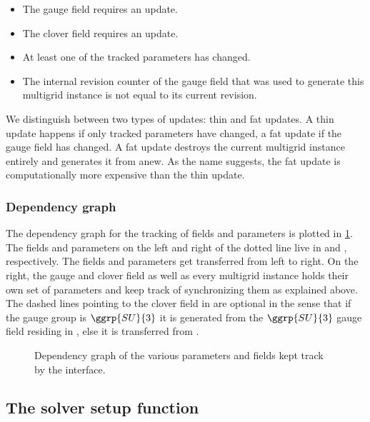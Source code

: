 \begin{itemize}
  \item The gauge field requires an update.
  \item The clover field requires an update.
  \item At least one of the tracked parameters has changed.
  \item The internal revision counter of the gauge field that was used to generate this multigrid instance is not equal to its current revision.
\end{itemize}
We distinguish between two types of updates: thin and fat updates.
A thin update happens if only tracked parameters have changed, a fat update if the gauge field has changed.
A fat update destroys the current multigrid instance entirely and generates it from anew.
As the name suggests, the fat update is computationally more expensive than the thin update.

\subsubsection{Dependency graph}

The dependency graph for the tracking of fields and parameters is plotted in \cref{fig:dep}.
The fields and parameters on the left and right of the dotted line live in \openqxd and \quda, respectively.
The fields and parameters get transferred from left to right.
On the right, the gauge and clover field as well as every multigrid instance holds their own set of parameters and keep track of synchronizing them as explained above.
The dashed lines pointing to the clover field in \quda are optional in the sense that if the gauge group is $\ggrp{SU}{3}$ it is generated from the $\ggrp{SU}{3}$ gauge field residing in \quda, else it is transferred from \openqxd.
\begin{figure}
  
  \caption{Dependency graph of the various parameters and fields kept track by the interface.}
  \label{fig:dep}
\end{figure}

\subsection{The solver setup function}
\label{sec:interface:getsolverhandle}

